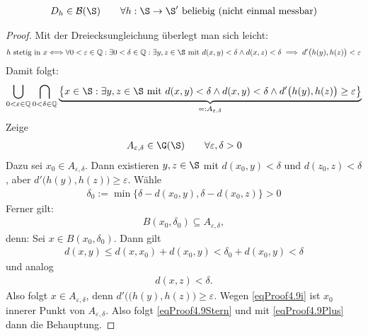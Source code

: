 \begin{lemma}\label{lemma4.9}
\begin{align*}
D_h\in\B(\S)\qquad\forall h:\S\to\S'\text{ beliebig (nicht einmal messbar)}
\end{align*}
\end{lemma}
\begin{proof}
Mit der Dreiecksungleichung überlegt man sich leicht:
\begin{align*}
h\text{ stetig in }x
\Longleftrightarrow
\forall 0<\varepsilon\in\Q:\exists 0<\delta\in\Q:\exists y,z\in\S\mit
d(x,y)<\delta\wedge d(x,z)<\delta
\implies d'\big(h(y),h(z)\big)<\varepsilon
\end{align*}
Damit folgt:
\begin{align}\label{eqProof4.9Plus}
\bigcup\limits_{0<\varepsilon\in\Q}\bigcap\limits_{0<\delta\in\Q}\underbrace{\big\lbrace x\in\S:\exists y,z\in\S\mit d(x,y)<\delta\wedge d(x,y)<\delta\wedge d'\big(h(y),h(z)\big)\geq\varepsilon\big\rbrace}_{=:A_{\varepsilon,\delta}}
\end{align}
Zeige 
\begin{align}\label{eqProof4.9Stern}
A_{\varepsilon,\delta}\in\G(\S)\qquad\forall\varepsilon,\delta>0
\end{align}
Dazu sei $x_0\in A_{\varepsilon,\delta}$. Dann existieren $y,z\in\S$ mit $d(x_0,y)<\delta$ und $d(z_0,z)<\delta$, aber $d'\big(h(y),h(z)\big)\geq\varepsilon$. Wähle
\begin{align*}
\delta_0:=\min\big\lbrace\delta- d(x_0,y),\delta-d(x_0,z)\big\rbrace>0
\end{align*}
Ferner gilt:
\begin{align}\label{eqProof4.9i}
B(x_0,\delta_0)\subseteq A_{\varepsilon,\delta},
\end{align}
denn: Sei $x\in B(x_0,\delta_0)$. Dann gilt
\begin{align*}
d(x,y)\leq d(x,x_0)+d(x_0,y)<\delta_0+d(x_0,y)<\delta
\end{align*}
und analog
\begin{align*}
d(x,z)<\delta.
\end{align*}
Also folgt $x\in A_{\varepsilon,\delta}$, denn $d'\big((h(y),h(z)\big)\geq\varepsilon$. Wegen \eqref{eqProof4.9i} ist $x_0$ innerer Punkt von $A_{\varepsilon,\delta}$. Also folgt \eqref{eqProof4.9Stern} und mit \eqref{eqProof4.9Plus} dann die Behauptung.
\end{proof}



